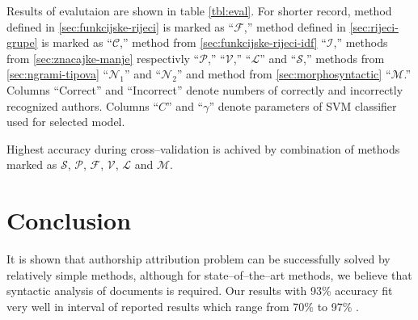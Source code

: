 \documentclass[11pt,english]{article}
\begin{document}
\begin{multicols}{2}
Results of evalutaion are shown in table \ref{tbl:eval}. For shorter record,
method defined in \ref{sec:funkcijske-rijeci} is marked as ``$\mathcal{F}$,''
method defined in \ref{sec:rijeci-grupe} is marked as ``$\mathcal{C}$,'' method
from \ref{sec:funkcijske-rijeci-idf} ``$\mathcal{I}$,'' methods from
\ref{sec:znacajke-manje} respectivly ``$\mathcal{P}$,'' ``$\mathcal{V}$,'' 
``$\mathcal{L}$'' and ``$\mathcal{S}$,'' methods from \ref{sec:ngrami-tipova}
``$\mathcal{N}_1$'' and ``$\mathcal{N}_2$'' and method from
\ref{sec:morphosyntactic} ``$\mathcal{M}$.'' Columns ``Correct'' and ``Incorrect'' denote numbers of correctly and incorrectly recognized authors.
Columns ``$C$'' and ``$\gamma$'' denote parameters of SVM classifier used for
selected model.

Highest accuracy during cross--validation is achived by combination of
methods marked as $\mathcal{S}$, $\mathcal{P}$, $\mathcal{F}$, $\mathcal{V}$,
$\mathcal{L}$ and $\mathcal{M}$.

% 
% 

\section{Conclusion}
It is shown that authorship attribution problem can be successfully solved by
relatively simple methods, although for state--of--the--art methods, we
believe that syntactic analysis of documents is required. Our results with
93\% accuracy fit very well in interval of reported results which range from
70\% to 97\% \citep{coyotl2006authorship,keselj2003n,luyckx2005shallow,stamatatos2001computer}.


\end{multicols}
\end{document}
